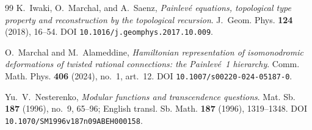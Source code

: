 \documentclass[11pt,reqno]{amsart}
\renewcommand{\_}{\vquadorigunderscore\allowbreak}
\theoremstyle{plain}
\theoremstyle{definition}
\begin{document}
\begin{thebibliography}{99}
K.~Iwaki, O.~Marchal, and A.~Saenz,
\emph{Painlev\'e equations, topological type property and reconstruction by the topological
recursion}.
J.~Geom. Phys. \textbf{124} (2018), 16--54.
DOI \texttt{10.1016/j.geomphys.2017.10.009}.

O.~Marchal and M.~Alameddine,
\emph{Hamiltonian representation of isomonodromic deformations of twisted rational connections: the
Painlev\'e~1 hierarchy}.
Comm. Math. Phys. \textbf{406} (2024), no.~1, art.~12.
DOI \texttt{10.1007/s00220-024-05187-0}.

Yu.~V.~Nesterenko,
\emph{Modular functions and transcendence questions}.
Mat. Sb. \textbf{187} (1996), no.~9, 65--96; English transl. Sb. Math. \textbf{187} (1996),
1319--1348.
DOI \texttt{10.1070/SM1996v187n09ABEH000158}.

\end{thebibliography}
\end{document}
